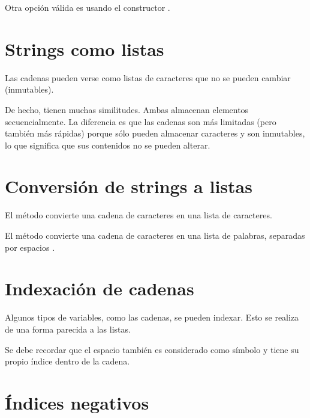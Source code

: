 
Otra opción válida es usando el constructor .


\section{Strings como listas}

Las cadenas pueden verse como listas de caracteres que no se pueden cambiar (inmutables).


De hecho, tienen muchas similitudes.
Ambas almacenan elementos secuencialmente.
La diferencia es que las cadenas son más limitadas (pero también más rápidas) porque sólo pueden almacenar caracteres y son inmutables, lo que significa que sus contenidos no se pueden alterar.

\section{Conversión de strings a listas}

El método  convierte una cadena de caracteres en una lista de caracteres.


El método  convierte una cadena de caracteres en una lista de palabras, separadas por espacios \ttt{\qq  \qq}.


\section{Indexación de cadenas}

Algunos tipos de variables, como las cadenas, se pueden indexar. Esto se realiza de una forma parecida a las listas.


Se debe recordar que el espacio \ttt{\qq  \qq} también es considerado como símbolo y tiene su propio índice dentro de la cadena.
\medskip

\section{Índices negativos}

